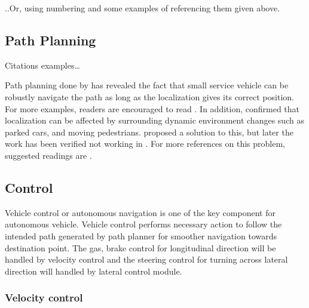 \documentclass[10 pt,letterpaper,conference]{IEEEtran}
\begin{document}
..Or, using numbering and some examples of referencing them given above.

\subsection{Path Planning}\label{path-planning-1}

Citations examples\ldots{}

Path planning done by \citeauthor{SongZW_IV_2015} has revealed the fact
that small service vehicle can be robustly navigate the path as long as
the localization gives its correct position. For more examples, readers
are encouraged to read \citep{Corley-etal_2011}. In addition,
\citet{Corley-etal_2012} confirmed that localization can be affected by
surrounding dynamic environment changes such as parked cars, and moving
pedestrians. \citet{Aalst-etal_2004} proposed a solution to this, but
later the work has been verified not working in
\citep{Abadi-etal_2008, Abebe-etal_2009}. For more references on this
problem, suggested readings are
\citep{Ackerman-Halverson_1998, Agrawal-etal_1998, Ali-etal_2012, Alipour-etal_2013}.

\subsection{Control}\label{control-1}

Vehicle control or autonomous navigation is one of the key component for
autonomous vehicle. Vehicle control performs necessary action to follow
the intended path generated by path planner for smoother navigation
towards destination point. The gas, brake control for longitudinal
direction will be handled by velocity control and the steering control
for turning across lateral direction will handled by lateral control
module.

\subsubsection{Velocity control}\label{velocity-control}
\end{document}
